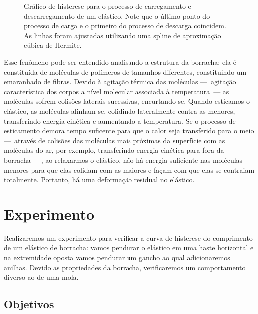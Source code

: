 \begin{figure}[!h]\forcerectofloat
	\centering
	
	\caption{Gráfico de histerese para o processo de carregamento e descarregamento de um elástico. Note que o último ponto do processo de carga e o primeiro do processo de descarga coincidem. As linhas foram ajustadas utilizando uma spline de aproximação cúbica de Hermite.}
	\label{Fig:HistereseElast}
\end{figure}

Esse fenômeno pode ser entendido analisando a estrutura da borracha: ela é constituída de moléculas de polímeros de tamanhos diferentes, constituindo um emaranhado de fibras. Devido à agitação térmica das moléculas ---~agitação característica dos corpos a nível molecular associada à temperatura~--- as moléculas sofrem colisões laterais sucessivas, encurtando-se. Quando esticamos o elástico, as moléculas alinham-se, colidindo lateralmente contra as menores, transferindo energia cinética e aumentando a temperatura. Se o processo de esticamento demora tempo suficente para que o calor seja transferido para o meio ---~através de colisões das moléculas mais próximas da superfície com as moléculas do ar, por exemplo, transferindo energia cinética para fora da borracha~---, ao relaxarmos o elástico, não há energia suficiente nas moléculas menores para que elas colidam com as maiores e façam com que elas se contraiam totalmente. Portanto, há uma deformação residual no elástico.

\section{Experimento}

Realizaremos um experimento para verificar a curva de histerese do comprimento de um elástico de borracha: vamos pendurar o elástico em uma haste horizontal e na extremidade oposta vamos pendurar um gancho ao qual adicionaremos anilhas. Devido as propriedades da borracha, verificaremos um comportamento diverso ao de uma mola.

\subsection{Objetivos}
\label{Sec:ObjetivosElasticidade}


